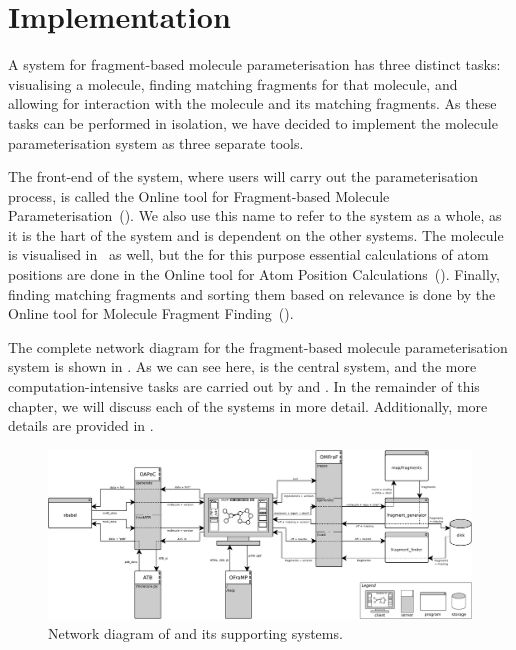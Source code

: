 \chapter{Implementation}

\setcounter{topnumber}{1}
\setcounter{bottomnumber}{1}
\setlength{\textfloatsep}{1em}
\renewcommand{\topfraction}{0.9}
\renewcommand{\bottomfraction}{0.9}
\renewcommand{\textfraction}{0.1}

A system for fragment-based molecule parameterisation has three distinct tasks: visualising a molecule, finding matching fragments for that molecule, and allowing for interaction with the molecule and its matching fragments. As these tasks can be performed in isolation, we have decided to implement the molecule parameterisation system as three separate tools.

The front-end of the system, where users will carry out the parameterisation process, is called the Online tool for Fragment-based Molecule Parameterisation~(\oframp). We also use this name to refer to the system as a whole, as it is the hart of the system and is dependent on the other systems. The molecule is visualised in \oframp\ as well, but the for this purpose essential calculations of atom positions are done in the Online tool for Atom Position Calculations~(\oapoc). Finally, finding matching fragments and sorting them based on relevance is done by the Online tool for Molecule Fragment Finding~(\omfraf).

The complete network diagram for the fragment-based molecule parameterisation system is shown in . As we can see here, \oframp{} is the central system, and the more computation-intensive tasks are carried out by \oapoc{} and \omfraf{}. In the remainder of this chapter, we will discuss each of the systems in more detail. Additionally, more details are provided in .

\begin{figure}
\center
\includegraphics[width=\textwidth]{img/network_diagram.pdf}
\vspace{1em}
\caption{Network diagram of \oframp{} and its supporting systems.}
\end{figure}



